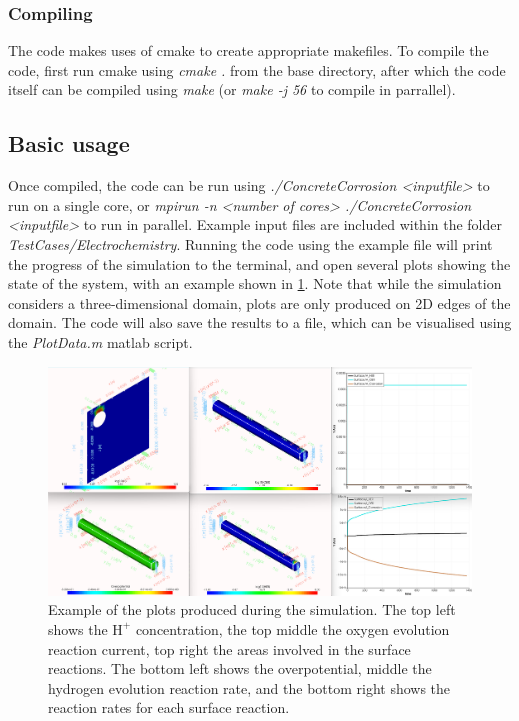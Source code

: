 \documentclass[3p]{elsarticle} %
\begin{document}
\subsubsection{Compiling}
The code makes uses of cmake to create appropriate makefiles. To compile the code, first run cmake using \textit{cmake .} from the base directory, after which the code itself can be compiled using \textit{make} (or \textit{make -j 56} to compile in parrallel). 


\subsection{Basic usage}
\label{sec:usage}
Once compiled, the code can be run using \textit{./ConcreteCorrosion <inputfile>} to run on a single core, or \textit{mpirun -n <number of cores> ./ConcreteCorrosion <inputfile>} to run in parallel. Example input files are included within the folder \textit{TestCases/Electrochemistry}. Running the code using the example file will print the progress of the simulation to the terminal, and open several plots showing the state of the system, with an example shown in \cref{fig:Results}. Note that while the simulation considers a three-dimensional domain, plots are only produced on 2D edges of the domain. The code will also save the results to a file, which can be visualised using the \textit{PlotData.m} matlab script. 

\begin{figure}
	\centering
	\includegraphics[width=14cm]{Screenshot.png}
	\caption{Example of the plots produced during the simulation. The top left shows the $\text{H}^+$ concentration, the top middle the oxygen evolution reaction current, top right the areas involved in the surface reactions. The bottom left shows the overpotential, middle the hydrogen evolution reaction rate, and the bottom right shows the reaction rates for each surface reaction.}
	\label{fig:Results}
\end{figure}
\end{document}
